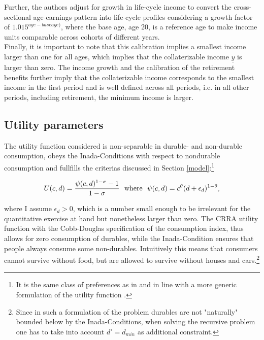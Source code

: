\documentclass[12pt,a4paper,leqno]{article}
\theoremstyle{definition}
\begin{document}
Further, the authors adjust for growth in life-cycle income to convert the cross-sectional age-earnings pattern into life-cycle profiles considering a growth factor of $1.015^{age-base age)}$, where the base age, age 20, is a reference age to make income units comparable across cohorts of different years.\\
Finally, it is important to note that this calibration implies a smallest income larger than one for all ages, which implies that the collaterizable income $\underline{y}$ is larger than zero. The income growth and the calibration of the retirement benefits further imply that the collaterizable income corresponds to the smallest income in the first period and is well defined across all periods, i.e. in all other periods, including retirement, the minimum income is larger. 

\subsection{Utility parameters}

The utility function considered is non-separable in durable- and non-durable consumption, obeys the Inada-Conditions with respect to nondurable consumption and fullfills the criterias discussed in Section \ref{model}:\footnote{It is the same class of preferences as in \cite{hintermaier2010} and in line with a more generic formulation of the utility function \citep{FV&K2011}.}

\begin{equation}
U(c,d)=\frac{\psi(c,d)^{1-\sigma}-1}{1-\sigma} \ \ \textnormal{where} \ \ \psi(c,d)=c^{\theta}(d+\epsilon_{d})^{1-\theta},
\end{equation}

where I assume $\epsilon_{d} > 0$, which is a number small enough to be irrelevant for the quantitative exercise at hand but nonetheless larger than zero. The CRRA utility function with the Cobb-Douglas specification of the consumption index, thus allows for zero consumption of durables, while the Inada-Condition ensures that people always consume some non-durables. Intuitively this means that consumers cannot survive without food, but are allowed to survive without houses and cars.\footnote{Since in such a formulation of the problem durables are not "naturally" bounded below by the Inada-Conditions, when solving the recursive problem one has to take into account $d' = d_{min}$ as additional constraint.}
\end{document}
